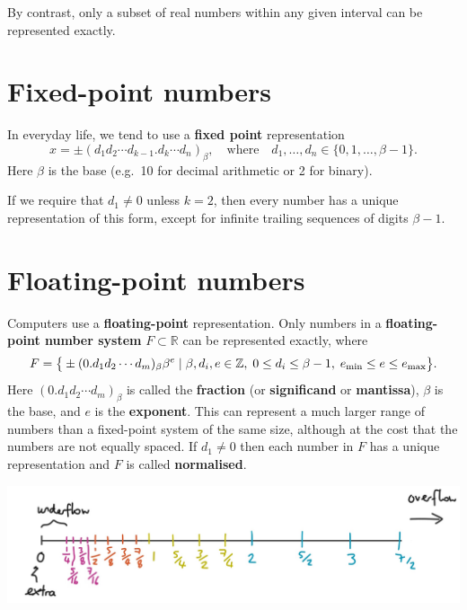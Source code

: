 \documentclass[
  letterpaper,
  DIV=11,
  numbers=noendperiod]{scrreprt}
\begin{document}
By contrast, only a subset of real numbers within any given interval can
be represented exactly.

\section{Fixed-point numbers}\label{fixed-point-numbers}

In everyday life, we tend to use a \textbf{fixed point} representation
\[
x = \pm (d_1d_2\cdots d_{k-1}.d_k\cdots d_n)_\beta, \quad \textrm{where} \quad d_1,\ldots,d_n\in\{0,1,\ldots,\beta - 1\}.
\] Here \(\beta\) is the base (e.g.~10 for decimal arithmetic or 2 for
binary).

If we require that \(d_1\neq 0\) unless \(k=2\), then every number has a
unique representation of this form, except for infinite trailing
sequences of digits \(\beta - 1\).

\section{Floating-point numbers}\label{floating-point-numbers}

Computers use a \textbf{floating-point} representation. Only numbers in
a \textbf{floating-point number system} \(F\subset\mathbb{R}\) can be
represented exactly, where \[
F = \big\{ \pm (0.d_1d_2\cdots d_{m})_\beta\beta^e \;| \;  \beta, d_i, e \in \mathbb{Z}, \;0 \leq d_i \leq \beta-1, \;e_{\rm min} \leq e \leq e_{\rm max}\big\}.
\] Here \((0.d_1d_2\cdots d_{m})_\beta\) is called the \textbf{fraction}
(or \textbf{significand} or \textbf{mantissa}), \(\beta\) is the base,
and \(e\) is the \textbf{exponent}. This can represent a much larger
range of numbers than a fixed-point system of the same size, although at
the cost that the numbers are not equally spaced. If \(d_1\neq 0\) then
each number in \(F\) has a unique representation and \(F\) is called
\textbf{normalised}.

\begin{center}
\includegraphics[width=0.7\linewidth,height=\textheight,keepaspectratio]{im/fp1.jpg}
\end{center}
\end{document}
